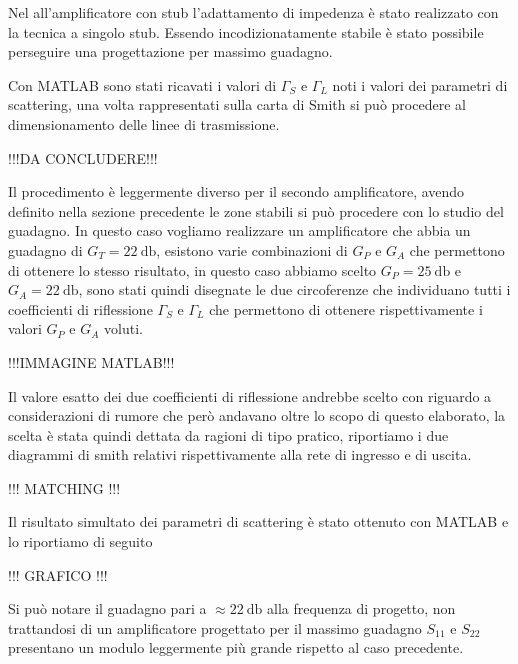 \documentclass[12pt]{article}
\begin{document}
Nel all'amplificatore con stub l'adattamento di impedenza è stato realizzato con la tecnica a singolo stub. Essendo incodizionatamente stabile è stato possibile perseguire una progettazione per massimo guadagno.

Con MATLAB sono stati ricavati i valori di $\Gamma_{S}$ e $\Gamma_{L}$ noti i valori dei parametri di scattering, una volta rappresentati sulla carta di Smith si può procedere al dimensionamento delle linee di trasmissione. 

!!!DA CONCLUDERE!!!

Il procedimento è leggermente diverso per il secondo amplificatore, avendo definito nella sezione precedente le zone stabili si può procedere con lo studio del guadagno.
In questo caso vogliamo realizzare un amplificatore che abbia un guadagno di $G_T=\SI{22}{\decibel}$, esistono varie combinazioni di $G_P$ e $G_A$ che permettono di ottenere lo stesso risultato, in questo caso abbiamo scelto $G_P=\SI{25}{\decibel}$ e $G_A=\SI{22}{\decibel}$, sono stati quindi disegnate le due circoferenze che individuano tutti i coefficienti di riflessione $\Gamma_{S}$ e $\Gamma_{L}$ che permettono di ottenere rispettivamente i valori $G_P$ e $G_A$ voluti.

!!!IMMAGINE MATLAB!!!

Il valore esatto dei due coefficienti di riflessione andrebbe scelto con riguardo a considerazioni di rumore che però andavano oltre lo scopo di questo elaborato, la scelta è stata quindi dettata da ragioni di tipo pratico, riportiamo i due diagrammi di smith relativi rispettivamente alla rete di ingresso e di uscita.

!!! MATCHING !!!

Il risultato simultato dei parametri di scattering è stato ottenuto con MATLAB e lo riportiamo di seguito

!!! GRAFICO !!!

Si può notare il guadagno pari a $\approx\SI{22}{\decibel}$ alla frequenza di progetto, non trattandosi di un amplificatore progettato per il massimo guadagno $S_{11}$ e $S_{22}$ presentano un modulo leggermente più grande rispetto al caso precedente.

\end{document}
